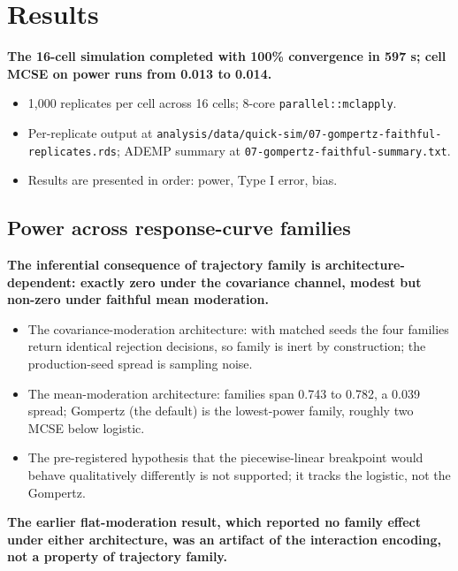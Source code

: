 \documentclass[
  11pt,
]{article}
\begin{document}
\section{Results}\label{results}

\textbf{The 16-cell simulation completed with 100\% convergence
in 597 s; cell MCSE on power runs from 0.013 to 0.014.}

\begin{itemize}\setlength{\itemsep}{2pt}\setlength{\parskip}{0pt}
\item 1{,}000 replicates per cell across 16 cells;
  8-core \texttt{parallel::mclapply}.
\item Per-replicate output at
  \texttt{analysis/data/quick-sim/07-gompertz-faithful-replicates.rds};
  ADEMP summary at \texttt{07-gompertz-faithful-summary.txt}.
\item Results are presented in order: power, Type I error,
  bias.
\end{itemize}

\subsection{Power across response-curve families}\label{power-across-response-curve-families}

\textbf{The inferential consequence of trajectory family is
architecture-dependent: exactly zero under the covariance
channel, modest but non-zero under faithful mean moderation.}

\begin{itemize}\setlength{\itemsep}{2pt}\setlength{\parskip}{0pt}
\item The covariance-moderation architecture: with matched seeds the four families
  return identical rejection decisions, so family is inert by
  construction; the production-seed spread is sampling noise.
\item The mean-moderation architecture: families span 0.743 to 0.782, a 0.039
  spread; Gompertz (the default) is the lowest-power family,
  roughly two MCSE below logistic.
\item The pre-registered hypothesis that the piecewise-linear
  breakpoint would behave qualitatively differently is not
  supported; it tracks the logistic, not the Gompertz.
\end{itemize}

\textbf{The earlier flat-moderation result, which reported no
family effect under either architecture, was an artifact of the
interaction encoding, not a property of trajectory family.}
\end{document}
